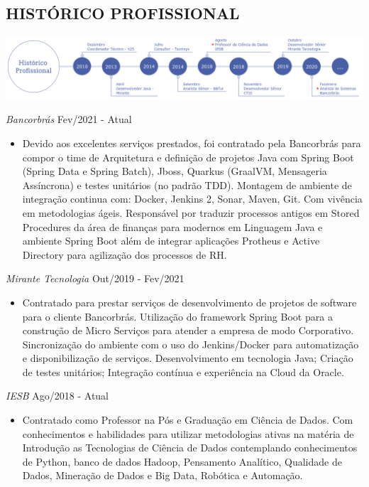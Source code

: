 \documentclass{res}
\begin{document}
\begin{resume}
		\section{HISTÓRICO PROFISSIONAL} %
		\vspace{8pt}
		\includegraphics[width=1.0\textwidth]{imagens/experiencia.png}
		
		{\sl Bancorbrás} \hfill Fev/2021 - Atual
		\begin{itemize}
			\item Devido aos excelentes serviços prestados, foi contratado pela Bancorbrás para compor o time de Arquitetura e definição de projetos Java com Spring Boot (Spring Data e Spring Batch), Jboss, Quarkus (GraalVM, Mensageria Assíncrona) e testes unitários (no padrão TDD). Montagem de ambiente de integração continua com: Docker, Jenkins 2, Sonar, Maven, Git. Com vivência em metodologias ágeis. Responsável por traduzir processos antigos em Stored Procedures da área de finanças para modernos em Linguagem Java e ambiente Spring Boot além de integrar aplicações Protheus e Active Directory para agilização dos processos de RH.
		\end{itemize}

		{\sl Mirante Tecnologia} \hfill Out/2019 - Fev/2021
		\begin{itemize}
			\item Contratado para prestar serviços de desenvolvimento de projetos de software para o cliente Bancorbrás. Utilização do framework Spring Boot para a construção de Micro Serviços para atender a empresa de modo Corporativo. Sincronização do ambiente com o uso do Jenkins/Docker para automatização e disponibilização de serviços. Desenvolvimento em tecnologia Java; Criação de testes unitários; Integração contínua e experiência na Cloud da Oracle. 
		\end{itemize}
		
		{\sl IESB} \hfill Ago/2018 - Atual
		\begin{itemize}
			\item Contratado como Professor na Pós e Graduação em Ciência de Dados. Com conhecimentos e habilidades para utilizar metodologias ativas na matéria de Introdução as Tecnologias de Ciência de Dados contemplando conhecimentos de Python, banco de dados Hadoop, Pensamento Analítico, Qualidade de Dados, Mineração de Dados e Big Data, Robótica e Automação.
		\end{itemize}
		

\end{resume}
\end{document}
